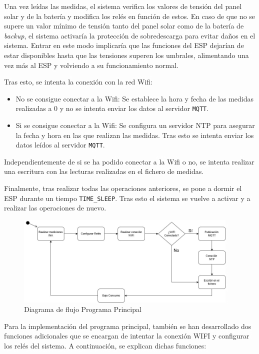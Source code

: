 Una vez leídas las medidas, el sistema verifica los valores de tensión del panel solar y de la batería y modifica los relés en función de estos.
En caso de que no se supere un valor mínimo de tensión tanto del panel solar como de la batería de \textit{backup}, el sistema activaría la protección de sobredescarga para evitar daños en el sistema. 
Entrar en este modo implicaría que las funciones del ESP dejarían de estar disponibles hasta que las tensiones superen los umbrales, alimentando una vez más al ESP y volviendo a su funcionamiento normal.

Tras esto, se intenta la conexión con la red Wifi:
\begin{itemize}
    \item No se consigue conectar a la Wifi: Se establece la hora y fecha de las medidas realizadas a 0 y no se intenta enviar los datos al servidor \texttt{MQTT}. 
    \item Si se consigue conectar a la Wifi: Se configura un servidor NTP para asegurar la fecha y hora en las que realizan las medidas. Tras esto se intenta enviar los datos leídos al servidor \texttt{MQTT}.
\end{itemize}

Independientemente de si se ha podido conectar a la Wifi o no, se intenta realizar una escritura con las lecturas realizadas en el fichero de medidas.

Finalmente, tras realizar todas las operaciones anteriores, se pone a dormir el ESP durante un tiempo \texttt{TIME\_SLEEP}. Tras esto el sistema se vuelve a activar y a realizar las operaciones de nuevo.

\begin{figure}[H]
    \centering
    \includegraphics[width=0.95\textwidth]{images/3-software/3-3-programaprincipal/DiagramaDeFlujoPOWER.jpg}
    \caption{Diagrama de flujo Programa Principal}
    \label{fig:3-3-1-DiagramaFlujo}
\end{figure}

Para la implementación del programa principal, también se han desarrollado dos funciones adicionales que se encargan de intentar la conexión WIFI y configurar los relés del sistema. A continuación, se explican dichas funciones:

